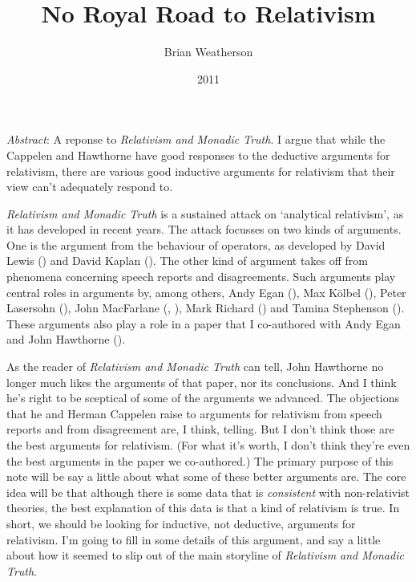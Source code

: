 \documentclass[
  11pt,
  letterpaper,
  DIV=11,
  numbers=noendperiod,
  twoside]{scrartcl}
\title{No Royal Road to Relativism}
\author{Brian Weatherson}
\date{2011}
\renewenvironment{abstract}
 {\vspace{-1.25cm}
 \quotation\small\noindent\emph{Abstract}:}
 {\endquotation}
\begin{document}
\maketitle
\begin{abstract}
A reponse to \emph{Relativism and Monadic Truth}. I argue that while the
Cappelen and Hawthorne have good responses to the deductive arguments
for relativism, there are various good inductive arguments for
relativism that their view can't adequately respond to.
\end{abstract}


\emph{Relativism and Monadic Truth} is a sustained attack on `analytical
relativism', as it has developed in recent years. The attack focusses on
two kinds of arguments. One is the argument from the behaviour of
operators, as developed by David Lewis ()
and David Kaplan (). The other kind
of argument takes off from phenomena concerning speech reports and
disagreements. Such arguments play central roles in arguments by, among
others, Andy Egan (), Max Kölbel
(), Peter Lasersohn
(), John MacFarlane
(,
), Mark Richard
() and Tamina Stephenson
(). These arguments also play
a role in a paper that I co-authored with Andy Egan and John Hawthorne
().

As the reader of \emph{Relativism and Monadic Truth} can tell, John
Hawthorne no longer much likes the arguments of that paper, nor its
conclusions. And I think he's right to be sceptical of some of the
arguments we advanced. The objections that he and Herman Cappelen raise
to arguments for relativism from speech reports and from disagreement
are, I think, telling. But I don't think those are the best arguments
for relativism. (For what it's worth, I don't think they're even the
best arguments in the paper we co-authored.) The primary purpose of this
note will be say a little about what some of these better arguments are.
The core idea will be that although there is some data that is
\emph{consistent} with non-relativist theories, the best explanation of
this data is that a kind of relativism is true. In short, we should be
looking for inductive, not deductive, arguments for relativism. I'm
going to fill in some details of this argument, and say a little about
how it seemed to slip out of the main storyline of \emph{Relativism and
Monadic Truth}.
\end{document}

